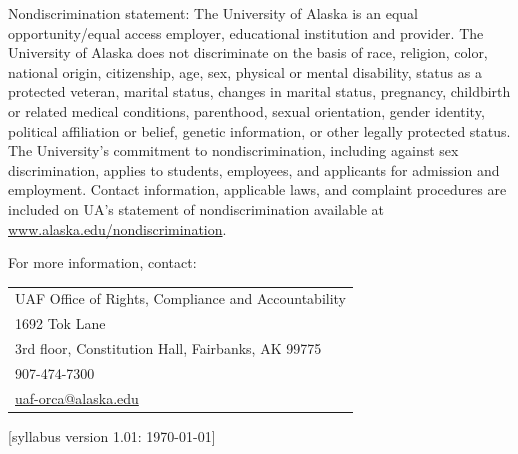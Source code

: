 \documentclass[12pt]{article}
\begin{document}
Nondiscrimination statement: The University of Alaska is an equal opportunity/equal access employer, educational institution and provider. The University of Alaska does not discriminate on the basis of race, religion, color, national origin, citizenship, age, sex, physical or mental disability, status as a protected veteran, marital status, changes in marital status, pregnancy, childbirth or related medical conditions, parenthood, sexual orientation, gender identity, political affiliation or belief, genetic information, or other legally protected status. The University's commitment to nondiscrimination, including against sex discrimination, applies to students, employees, and applicants for admission and employment. Contact information, applicable laws, and complaint procedures are included on UA's statement of nondiscrimination available at \url{www.alaska.edu/nondiscrimination}.


For more information, contact: 
\begin{tabular}{l}
UAF Office of Rights, Compliance and Accountability\\
1692 Tok Lane\\
3rd floor, Constitution Hall, Fairbanks, AK 99775\\
907-474-7300\\
\url{uaf-orca@alaska.edu}
\end{tabular}

\hfill  \scriptsize [syllabus version 1.01: \today] \normalsize
\end{document}
